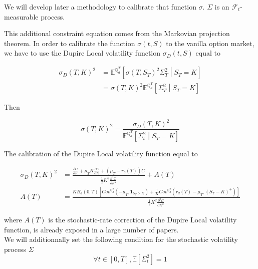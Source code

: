 \documentclass{article}
\begin{document}
\noindent We will develop later a methodology to calibrate that function $\sigma$. $\Sigma$ is an $\mathcal{F}_t$-measurable process.

\noindent This additional constraint equation comes from the Markovian projection theorem. In order to calibrate the function $\sigma(t,S)$ to the vanilla option market, we have to use the Dupire Local volatility function $\sigma_D(t,S)$ equal to 

\begin{equation}
	\begin{aligned}
		\sigma_D(T,K)^2 &= \mathbb{E}^{\mathbb{Q}_d^T}\left[\sigma(T,S_T)^2 \Sigma_T^2\middle|S_T=K\right]\\
		&= \sigma(T,K)^2 \mathbb{E}^{\mathbb{Q}_d^T}\left[\Sigma_T^2\middle| S_T= K \right]
	\end{aligned}
\end{equation}

\noindent Then

\begin{equation}
	\sigma(T,K)^2 = \frac{\sigma_D(T,K)^2}{\mathbb{E}^{\mathbb{Q}_d^T}\left[\Sigma^2_t\middle| S_T= K \right]}
\end{equation}

\noindent The calibration of the Dupire Local volatility function equal to 

\begin{equation}
\begin{aligned}
	\sigma_D(T,K)^2 &= \frac{\frac{\partial C}{\partial K} + \mu_T K \frac{\partial C}{\partial K} + \left(\mu_T - r_d(T)\right) C}{\frac{1}{2}K^2 \frac{\partial^2 C}{\partial K^2}} + A(T)\\
	A(T) &= \frac{KB_d(0,T) \left[Cov^{\mathbb{Q}_d^T}\left(-\mu_T, \textbf{1}_{S_T>K}\right) + \frac{1}{K} Cov^{\mathbb{Q}_d^T}\left(r_d(T)-\mu_T, \left(S_T-K\right)^+\right)\right]}{\frac{1}{2}K^2 \frac{\partial^2 C}{\partial K^2}}
\end{aligned}
\end{equation}

\noindent where $A(T)$ is the stochastic-rate correction of the Dupire Local volatility function, is already exposed in a large number of papers.\\

\noindent We will additionnally set the following condition for the stochastic volatility process $\Sigma$ 
\begin{equation}
	\label{eq:AdditionalConditionStochVol}
	\forall t \in [0,T], \mathbb{E}\left[\Sigma_t^2 \right] = 1
\end{equation}
\end{document}
